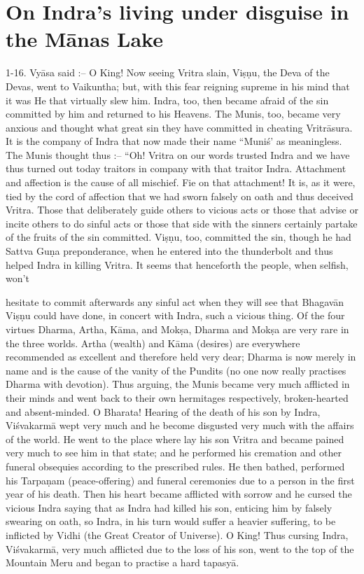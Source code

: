 \chapter{On Indra's living under disguise in the M\=anas Lake}

1-16. Vy\=asa said :-- O King! Now seeing Vritra slain, Vi\d{s}\d{n}u, the Deva of the Devas, went to Vaikuntha; but, with this fear reigning supreme in his mind that it was He that virtually slew him. Indra, too, then became afraid of the sin committed by him and returned to his Heavens. The Munis, too, became very anxious and thought what great sin they have committed in cheating Vritr\=asura. It is the company of Indra that now made their name ``Muni\'s' as meaningless. The Munis thought thus :-- ``Oh! Vritra on our words trusted Indra and we have thus turned out today traitors in company with that traitor Indra. Attachment and affection is the cause of all mischief. Fie on that attachment! It is, as it were, tied by the cord of affection that we had sworn falsely on oath and thus deceived Vritra. Those that deliberately guide others to vicious acts or those that advise or incite others to do sinful acts or those that side with the sinners certainly partake of the fruits of the sin committed. Vi\d{s}\d{n}u, too, committed the sin, though he had Sattva Gu\d{n}a preponderance, when he entered into the thunderbolt and thus helped Indra in killing Vritra. It seems that henceforth the people, when selfish, won't

hesitate to commit afterwards any sinful act when they will see that Bhagav\=an Vi\d{s}\d{n}u could have done, in concert with Indra, such a vicious thing. Of the four virtues Dharma, Artha, K\=ama, and Mok\d{s}a, Dharma and Mok\d{s}a are very rare in the three worlds. Artha (wealth) and K\=ama (desires) are everywhere recommended as excellent and therefore held very dear; Dharma is now merely in name and is the cause of the vanity of the Pundits (no one now really practises Dharma with devotion). Thus arguing, the Munis became very much afflicted in their minds and went back to their own hermitages respectively, broken-hearted and absent-minded. O Bharata! Hearing of the death of his son by Indra, Vi\'svakarm\=a wept very much and he become disgusted very much with the affairs of the world. He went to the place where lay his son Vritra and became pained very much to see him in that state; and he performed his cremation and other funeral obsequies according to the prescribed rules. He then bathed, performed his Tarpa\d{n}am (peace-offering) and funeral ceremonies due to a person in the first year of his death. Then his heart became afflicted with sorrow and he cursed the vicious Indra saying that as Indra had killed his son, enticing him by falsely swearing on oath, so Indra, in his turn would suffer a heavier suffering, to be inflicted by Vidhi (the Great Creator of Universe). O King! Thus cursing Indra, Vi\'svakarm\=a, very much afflicted due to the loss of his son, went to the top of the Mountain Meru and began to practise a hard tapasy\=a.

